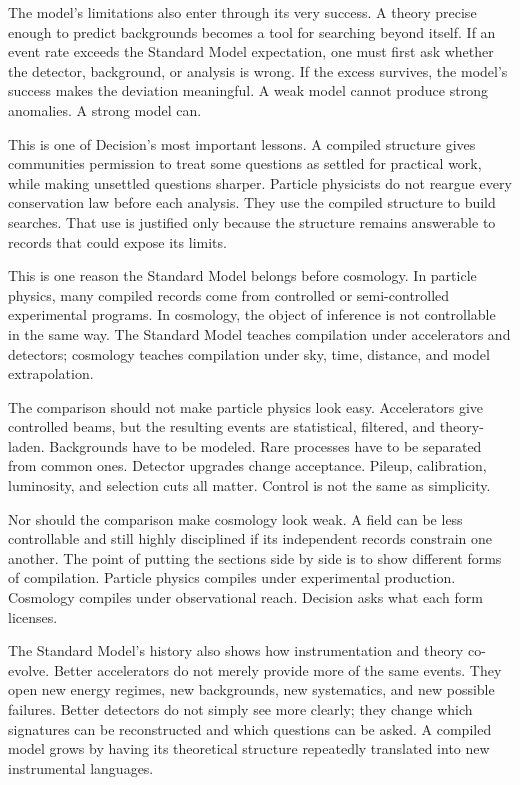 The model's limitations also enter through its very success. A theory precise
enough to predict backgrounds becomes a tool for searching beyond itself. If
an event rate exceeds the Standard Model expectation, one must first ask
whether the detector, background, or analysis is wrong. If the excess
survives, the model's success makes the deviation meaningful. A weak model
cannot produce strong anomalies. A strong model can.

This is one of Decision's most important lessons. A compiled structure gives
communities permission to treat some questions as settled for practical work,
while making unsettled questions sharper. Particle physicists do not reargue
every conservation law before each analysis. They use the compiled structure
to build searches. That use is justified only because the structure remains
answerable to records that could expose its limits.

This is one reason the Standard Model belongs before cosmology. In particle
physics, many compiled records come from controlled or semi-controlled
experimental programs. In cosmology, the object of inference is not
controllable in the same way. The Standard Model teaches compilation under
accelerators and detectors; cosmology teaches compilation under sky, time,
distance, and model extrapolation.

The comparison should not make particle physics look easy. Accelerators give
controlled beams, but the resulting events are statistical, filtered, and
theory-laden. Backgrounds have to be modeled. Rare processes have to be
separated from common ones. Detector upgrades change acceptance. Pileup,
calibration, luminosity, and selection cuts all matter. Control is not the
same as simplicity.

Nor should the comparison make cosmology look weak. A field can be less
controllable and still highly disciplined if its independent records constrain
one another. The point of putting the sections side by side is to show
different forms of compilation. Particle physics compiles under experimental
production. Cosmology compiles under observational reach. Decision asks what
each form licenses.

The Standard Model's history also shows how instrumentation and theory
co-evolve. Better accelerators do not merely provide more of the same events.
They open new energy regimes, new backgrounds, new systematics, and new
possible failures. Better detectors do not simply see more clearly; they
change which signatures can be reconstructed and which questions can be
asked. A compiled model grows by having its theoretical structure repeatedly
translated into new instrumental languages.

